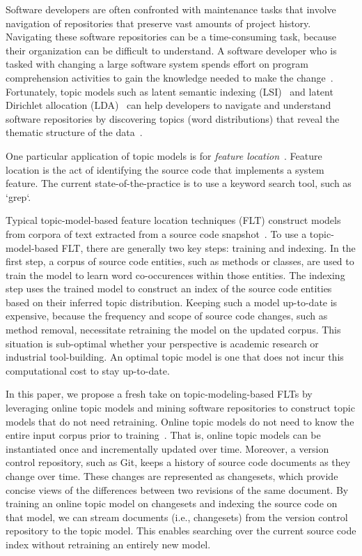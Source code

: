 
Software developers are often confronted with maintenance tasks that involve navigation of repositories that preserve vast amounts of project history.
Navigating these software repositories can be a time-consuming task, because their organization can be difficult to understand.
A software developer who is tasked with changing a large software system spends effort on program comprehension activities to gain the knowledge needed to make the change~\cite{Corbi:1989}.
Fortunately, topic models such as
latent semantic indexing (LSI)~\cite{Deerwester-etal:1990} and
latent Dirichlet allocation (LDA)~\cite{Blei-etal:2003}
can help developers to navigate and understand software repositories
by discovering topics (word distributions) that reveal the thematic structure
of the data~\cite{Linstead-etal:2007,Thomas-etal:2011,Hindle-etal:2012}.

One particular application of topic models is for \emph{feature location}~\cite{Marcus-etal:2004}.
Feature location is the act of identifying the source code that implements a system feature.
The current state-of-the-practice is to use a keyword search tool, such as `grep`.


Typical topic-model-based feature location techniques (FLT) construct models from corpora of text extracted from a source code snapshot~\cite{Dit-etal:2013b}.
To use a topic-model-based FLT, there are generally two key steps: training and indexing.
In the first step, a corpus of source code entities, such as methods or classes, are used to train the model to learn word co-occurences within those entities.
The indexing step uses the trained model to construct an index of the source code entities based on their inferred topic distribution.
Keeping such a model up-to-date is expensive, because the frequency and scope of source code changes, such as method removal, necessitate retraining the model on the updated corpus.
This situation is sub-optimal whether your perspective is academic research or industrial tool-building.
An optimal topic model is one that does not incur this computational cost to stay up-to-date.

In this paper, we propose a fresh take on topic-modeling-based FLTs by leveraging online topic models and mining software repositories to construct topic models that do not need retraining.
Online topic models do not need to know the entire input corpus prior to training~\cite{Hoffman-etal:2010,Radim:2011}.
That is, online topic models can be instantiated once and incrementally updated over time.
Moreover, a version control repository, such as Git, keeps a history of source code documents as they change over time.
These changes are represented as changesets, which provide concise views of the differences between two revisions of the same document.
By training an online topic model on changesets and indexing the source code on that model, we can stream documents (i.e., changesets) from the version control repository to the topic model.
This enables searching over the current source code index without retraining an entirely new model.


